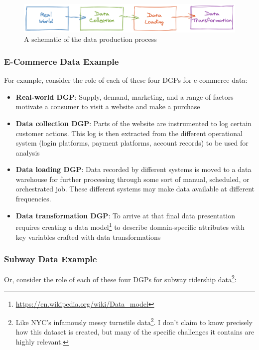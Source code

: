 \documentclass[
]{krantz}
\providecommand{\tightlist}{%
  \setlength{\itemsep}{0pt}\setlength{\parskip}{0pt}}
\renewcommand{\href}[2]{#2\footnote{\url{#1}}}
\begin{document}
\begin{figure}

{\centering \includegraphics[width=0.9\linewidth]{figures/data-dall/dgp} 

}

\caption{A schematic of the data production process}\label{fig:dgp}
\end{figure}

\hypertarget{e-commerce-data-example}{%
\subsubsection{E-Commerce Data Example}\label{e-commerce-data-example}}

For example, consider the role of each of these four DGPs for e-commerce data:

\begin{itemize}
\tightlist
\item
  \textbf{Real-world DGP}: Supply, demand, marketing, and a range of factors motivate a consumer to visit a website and make a purchase
\item
  \textbf{Data collection DGP}: Parts of the website are instrumented to log certain customer actions. This log is then extracted from the different operational system (login platforms, payment platforms, account records) to be used for analysis
\item
  \textbf{Data loading DGP}: Data recorded by different systems is moved to a data warehouse for further processing through some sort of manual, scheduled, or orchestrated job. These different systems may make data available at different frequencies.
\item
  \textbf{Data transformation DGP}: To arrive at that final data presentation requires creating a \href{https://en.wikipedia.org/wiki/Data_model}{data model} to describe domain-specific attributes with key variables crafted with data transformations
\end{itemize}

\hypertarget{subway-data-example}{%
\subsubsection{Subway Data Example}\label{subway-data-example}}

Or, consider the role of each of these four DGPs for subway ridership data\footnote{Like NYC's infamously messy \href{http://web.mta.info/developers/turnstile.html}{turnstile data}. I don't claim to know precisely how this dataset is created, but many of the specific challenges it contains are highly relevant.}:
\end{document}
